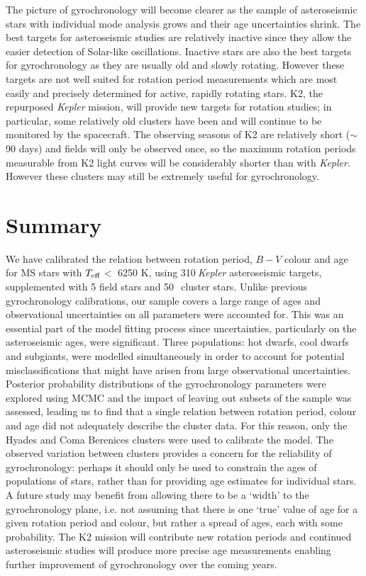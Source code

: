 \documentclass[11pt,preprint]{aastex}
\newcommand{\teff}{$T_{\rm{eff}}$}
\newcommand{\nastero}{310}
\newcommand{\nHC}{50~}
\begin{document}
The picture of gyrochronology will become clearer as the sample of
asteroseismic stars with individual mode analysis grows and their age
uncertainties shrink.
The best targets for asteroseismic studies are relatively inactive since they
allow the easier detection of Solar-like oscillations.
Inactive stars are also the best targets for gyrochronology as they are
usually old and slowly rotating.
However these targets are not well suited for
rotation period measurements which are most easily and precisely determined
for active, rapidly rotating stars.
K2, the repurposed {\it Kepler} mission, will provide new targets for rotation
studies; in particular, some relatively old clusters have been and will
continue to be monitored by the spacecraft.
The observing seasons of K2 are relatively short ($\sim$ 90 days) and fields
will only be observed once, so the maximum rotation periods measurable from
K2 light curves will be considerably shorter than with {\it Kepler}.
However these clusters may still be extremely useful for gyrochronology.

\section{Summary}
\label{sec:conclusions}

We have calibrated the relation between rotation period, $B-V$ colour and age
for MS stars with \teff$<$ 6250 K, using \nastero$~${\it Kepler} asteroseismic
targets, supplemented with 5 field stars and \nHC$~$cluster stars.
Unlike previous gyrochronology calibrations, our sample covers a large range
of ages and observational uncertainties on all parameters were accounted for.
This was an essential part of the model fitting process since
uncertainties, particularly on the asteroseismic ages, were significant.
Three populations: hot dwarfs, cool dwarfs and subgiants, were modelled
simultaneously in order to account for potential misclassifications that
might have arisen from large observational uncertainties.
Posterior probability distributions of the gyrochronology parameters were
explored using MCMC and the impact of leaving out subsets of the sample was
assessed, leading us to find that a single relation between rotation period,
colour and age did not adequately describe the cluster data.
For this reason, only the Hyades and Coma Berenices clusters were used to
calibrate the model.
The observed variation between clusters provides a concern for the reliability
of gyrochronology: perhaps it should only be used to constrain the ages of
populations of stars, rather than for providing age estimates for individual
stars.
A future study may benefit from allowing there to be a `width' to the
gyrochronology plane, i.e. not assuming that there is one `true' value of age
for a given rotation period and colour, but rather a spread of ages, each with
some probability.
The K2 mission will contribute new rotation periods and continued
asteroseismic studies will produce more precise age measurements enabling
further improvement of gyrochronology over the coming years.
\end{document}

